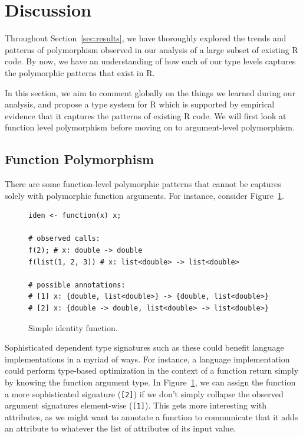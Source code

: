 \documentclass[acmsmall,10pt,review,anonymous]{acmart}\settopmatter{printfolios=true,printccs=false,printacmref=false}
\begin{document}
%
%
%
%
%
\section{Discussion}

Throughout Section~\ref{sec:results}, we have thoroughly explored the trends and patterns of polymorphism observed in our analysis of a large subset of existing R code.
By now, we have an understanding of how each of our type levels captures the polymorphic patterns that exist in R.

In this section, we aim to comment globally on the things we learned during our analysis, and propose a type system for R which is supported by empirical evidence that it captures the patterns of existing R code.
We will first look at function level polymorphism before moving on to argument-level polymorphism.

%
%
%
%
\subsection{Function Polymorphism}

There are some function-level polymorphic patterns that cannot be captures solely with polymorphic function arguments.
For instance, consider Figure~\ref{fig:funanno}.

\begin{figure}[!hb]{\small\begin{lstlisting}[style=R]
iden <- function(x) x;

# observed calls:
f(2); # x: double -> double
f(list(1, 2, 3)) # x: list<double> -> list<double>

# possible annotations:
# [1] x: {double, list<double>} -> {double, list<double>}
# [2] x: {double -> double, list<double> -> list<double>}
\end{lstlisting}}\caption{Simple identity function.}\label{fig:funanno}\end{figure}

Sophisticated dependent type signatures such as these could benefit language implementations in a myriad of ways.
For instance, a language implementation could perform type-based optimization in the context of a function return simply by knowing the function argument type.
In Figure~\ref{fig:funanno}, we can assign the function a more sophisticated signature ({\tt [2]}) if we don't simply collapse the observed argument signatures element-wise ({\tt [1]}).
This gets more interesting with attributes, as we might want to annotate a function to communicate that it adds an attribute to whatever the list of attributes of its input value.
\end{document}
